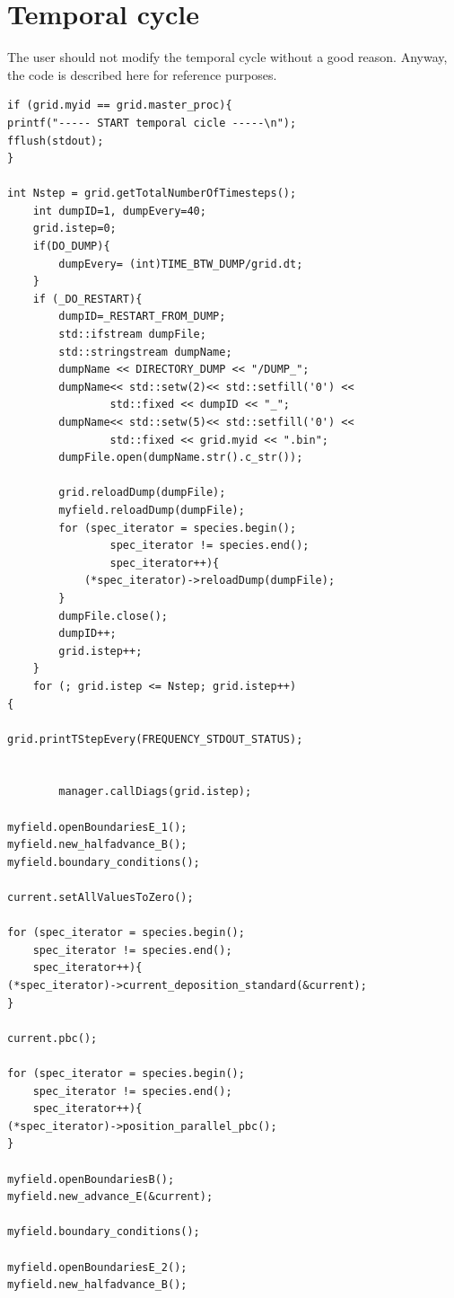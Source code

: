 \documentclass[11pt,a4paper]{report}
\begin{document}
\section{Temporal cycle}
The user should not modify the temporal cycle without a good reason. Anyway, the code is described here for reference purposes.
\begin{lstlisting}[backgroundcolor=\color{no_modify}]
	if (grid.myid == grid.master_proc){
printf("----- START temporal cicle -----\n");
fflush(stdout);
}

int Nstep = grid.getTotalNumberOfTimesteps();
    int dumpID=1, dumpEvery=40;
    grid.istep=0;
    if(DO_DUMP){
        dumpEvery= (int)TIME_BTW_DUMP/grid.dt;
    }
    if (_DO_RESTART){
        dumpID=_RESTART_FROM_DUMP;
        std::ifstream dumpFile;
        std::stringstream dumpName;
        dumpName << DIRECTORY_DUMP << "/DUMP_";
        dumpName<< std::setw(2)<< std::setfill('0') << 
        		std::fixed << dumpID << "_";
        dumpName<< std::setw(5)<< std::setfill('0') << 
        		std::fixed << grid.myid << ".bin";
        dumpFile.open(dumpName.str().c_str());

        grid.reloadDump(dumpFile);
        myfield.reloadDump(dumpFile);
        for (spec_iterator = species.begin(); 
        		spec_iterator != species.end(); 
        		spec_iterator++){
            (*spec_iterator)->reloadDump(dumpFile);
        }
        dumpFile.close();
        dumpID++;
        grid.istep++;
    }
    for (; grid.istep <= Nstep; grid.istep++)
{

grid.printTStepEvery(FREQUENCY_STDOUT_STATUS);


        manager.callDiags(grid.istep); 

myfield.openBoundariesE_1();
myfield.new_halfadvance_B();
myfield.boundary_conditions();

current.setAllValuesToZero();

for (spec_iterator = species.begin(); 
	spec_iterator != species.end(); 
	spec_iterator++){
(*spec_iterator)->current_deposition_standard(&current);
}

current.pbc();

for (spec_iterator = species.begin(); 
	spec_iterator != species.end(); 
	spec_iterator++){
(*spec_iterator)->position_parallel_pbc();
}	

myfield.openBoundariesB();
myfield.new_advance_E(&current);

myfield.boundary_conditions();

myfield.openBoundariesE_2();
myfield.new_halfadvance_B();


\end{lstlisting}
\end{document}
